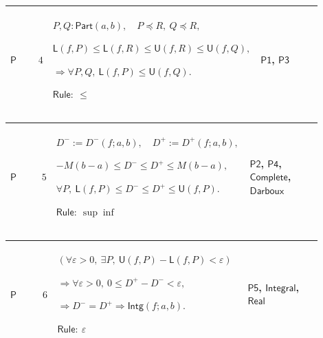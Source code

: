 \documentclass[12pt,reqno]{amsart}
\theoremstyle{blueplain}
\numberwithin{equation}{section}
\begin{document}
{\scriptsize \setlength{\parskip}{0pt}\nointerlineskip
\noindent 
\begin{tabular}{|@{}>{\centering\arraybackslash}m{0.10658\linewidth}|>{\centering\arraybackslash}m{0.03553\linewidth}|>{\centering\arraybackslash}m{0.52105\linewidth}|>{\centering\arraybackslash}m{0.23684\linewidth}|}
\hline
\hypertarget{proof:P4}{$\displaystyle \mathsf{P}$} & $\displaystyle 4$ & $%
\displaystyle P,Q:\mathsf{Part}(a,b),\quad P\preceq R,\ Q\preceq R,$\par$%
\displaystyle \mathsf{L}(f,P)\le\mathsf{L}(f,R)\le\mathsf{U}(f,R)\le\mathsf{U%
}(f,Q),$\par$\displaystyle \Rightarrow\forall P,Q,\ \mathsf{L}(f,P)\le%
\mathsf{U}(f,Q).$\par$\displaystyle \mathsf{Rule}:\ \le$ & \hyperlink{proof:P1}%
{$\displaystyle \mathsf{P1}$}, \hyperlink{proof:P3}{$\displaystyle \mathsf{P3%
}$} \\ \hline
\end{tabular}%
}

{\scriptsize \setlength{\parskip}{0pt}\nointerlineskip
\noindent 
\begin{tabular}{|@{}>{\centering\arraybackslash}m{0.10658\linewidth}|>{\centering\arraybackslash}m{0.03553\linewidth}|>{\centering\arraybackslash}m{0.52105\linewidth}|>{\centering\arraybackslash}m{0.23684\linewidth}|}
\hline
\hypertarget{proof:P5}{$\displaystyle \mathsf{P}$} & $\displaystyle 5$ & $%
\displaystyle D^-:=D^-(f;a,b),\quad D^+:=D^+(f;a,b),$\par$\displaystyle %
-M(b-a)\le D^-\le D^+\le M(b-a),$\par$\displaystyle \forall P,\ \mathsf{L}%
(f,P)\le D^-\le D^+\le\mathsf{U}(f,P).$\par$\displaystyle \mathsf{Rule}:\
\sup\inf$ & \hyperlink{proof:P2}{$\displaystyle \mathsf{P2}$}, \hyperlink{proof:P4}%
{$\displaystyle \mathsf{P4}$}, \hyperlink{ax:Complete}{$\displaystyle 
\mathsf{Complete}$}, \hyperlink{def:Darboux}{$\displaystyle \mathsf{Darboux}$%
} \\ \hline
\end{tabular}%
}

{\scriptsize \setlength{\parskip}{0pt}\nointerlineskip
\noindent 
\begin{tabular}{|@{}>{\centering\arraybackslash}m{0.10658\linewidth}|>{\centering\arraybackslash}m{0.03553\linewidth}|>{\centering\arraybackslash}m{0.52105\linewidth}|>{\centering\arraybackslash}m{0.23684\linewidth}|}
\hline
\hypertarget{proof:P6}{$\displaystyle \mathsf{P}$} & $\displaystyle 6$ & $%
\displaystyle (\forall\varepsilon>0,\ \exists P,\ \mathsf{U}(f,P)-\mathsf{L}%
(f,P)<\varepsilon)$\par$\displaystyle \Rightarrow\forall\varepsilon>0,\ 0\le
D^+-D^-<\varepsilon,$\par$\displaystyle \Rightarrow D^-=D^+\Rightarrow%
\mathsf{Intg}(f;a,b).$\par$\displaystyle \mathsf{Rule}:\ \varepsilon$ & 
\hyperlink{proof:P5}{$\displaystyle \mathsf{P5}$}, \hyperlink{def:Integral}{$%
\displaystyle \mathsf{Integral}$}, \hyperlink{ax:Real}{$\displaystyle 
\mathsf{Real}$} \\ \hline
\end{tabular}%
}
\end{document}
